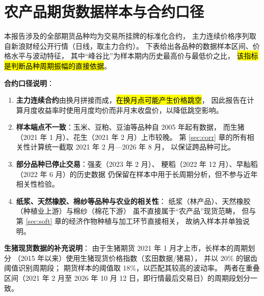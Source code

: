 \section{农产品期货数据样本与合约口径}
\label{app:contracts}

本报告涉及的全部期货品种均为交易所挂牌的标准化合约，
主力连续价格序列取自新浪财经公开行情（日线，取主力合约）。
下表给出各品种的数据样本区间、价格水平与波动特征，
其中“峰谷比”为样本期内历史最高价与最低价之比，
\hl{该指标是判断品种周期振幅的直接依据}。



\vspace{10pt}
\noindent\textbf{合约口径说明}：
\begin{enumerate}[leftmargin=1.5em, itemsep=2pt]
  \item \textbf{主力连续合约}由换月拼接而成，\hl{在换月点可能产生价格跳空}，
        因此报告在计算月度收益率时使用月度均价而非月末收盘价，以降低跳空影响。
  \item \textbf{样本端点不一致}：玉米、豆粕、豆油等品种自 2005 年起有数据，
        而生猪（2021 年 1 月）、花生（2021 年 2 月）上市较晚。
        第 \ref{sec:corr} 章的所有相关性计算统一截取
        2021 年 2 月---2026 年 8 月，
        以保证跨品种可比。
  \item \textbf{部分品种已停止交易}：强麦（2023 年 2 月）、
        粳稻（2022 年 12 月）、早籼稻（2022 年 6 月）的历史数据
        仍保留在样本中用于长周期分析，但不参与近年相关性检验。
  \item \textbf{纸浆、天然橡胶、棉纱等品种与农业的相关性}：
        纸浆（林产品）、天然橡胶（种植业上游）与棉纱（棉花下游）
        虽不直接属于“农产品”现货范畴，
        但与第 \ref{sec:soft} 章的经济作物种植与加工环节直接相关，
        故纳入样本并单独说明。
\end{enumerate}

\vspace{6pt}
\noindent\textbf{生猪现货数据的补充说明}：
由于生猪期货 2021 年 1 月才上市，长样本的周期划分
（2015 年以来）使用生猪现货价格指数（玄田数据/猪易），
并以 \num{20}\% 的锯齿阈值识别周期段；
期货样本的阈值取 \num{18}\%，以匹配其较高的波动率。
两者在重叠区间（2021 年 2 月至 2026 年 10 月 12 日，即行情最后交易日）的周期段划分一致。
